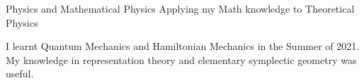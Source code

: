 \HeadingItemListStart
	\HeadingItem
		{Physics and Mathematical Physics}{}
		{Applying my Math knowledge to Theoretical Physics}{}
		\ItemListStart
			\item I learnt Quantum Mechanics and Hamiltonian Mechanics in the Summer of 2021. My knowledge in representation theory and elementary symplectic geometry was useful.
		\ItemListEnd
\HeadingItemListEnd

